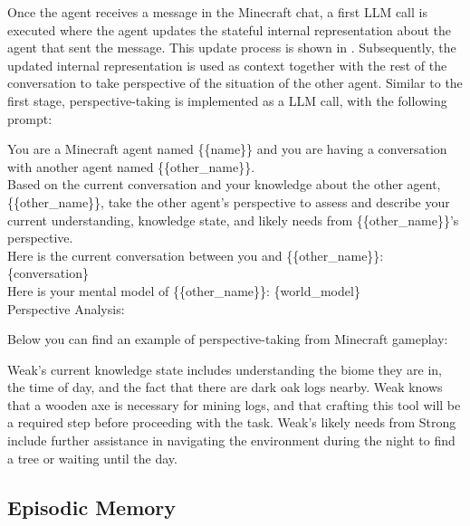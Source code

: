Once the agent receives a message in the Minecraft chat, a first LLM call is executed where the agent updates the stateful internal representation about the agent that sent the message. This update process is shown in . Subsequently, the updated internal representation is used as context together with the rest of the conversation to take perspective of the situation of the other \collabvoyager agent. Similar to the first stage, perspective-taking is implemented as a LLM call, with the following prompt:

\vspace{0.25cm}
\begin{tcolorbox}[title=Prompt for perspective-taking, label=box:prompt-perspective]
You are a Minecraft agent named \{\{name\}\} and you are having a conversation with another agent named \{\{other\_name\}\}. \\

Based on the current conversation and your knowledge about the other agent, \{\{other\_name\}\}, take the other agent's perspective to assess and describe your current understanding, knowledge state, and likely needs from \{\{other\_name\}\}'s perspective. \\

Here is the current conversation between you and \{\{other\_name\}\}:\{conversation\} \\

Here is your mental model of \{\{other\_name\}\}: \{world\_model\} \\

Perspective Analysis: 
\end{tcolorbox}

Below you can find an example of perspective-taking from Minecraft gameplay:

\begin{tcolorbox}[title=Expert agent taking perspective of weak agent, label=box:pers-prompt]
Weak’s current knowledge state includes understanding the biome they are in, the time of day, and the fact that there are
dark oak logs nearby. Weak knows that a wooden axe is necessary for mining logs, and that crafting this tool will be a
required step before proceeding with the task. Weak’s likely needs from Strong include further assistance in navigating the environment during the night to find a tree
or waiting until the day.
\end{tcolorbox}

\subsection{Episodic Memory}

